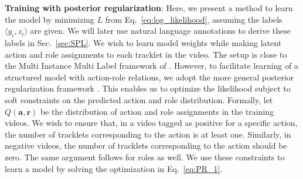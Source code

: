 \documentclass[10pt,twocolumn,letterpaper]{article}
\begin{document}
\noindent \textbf{Training with posterior regularization}: Here, we present a method to
learn the model by minimizing $L$ from Eq.~\ref{eq:log_likelihood}, 
assuming the labels $\langle y_i, z_i \rangle$ are given. 
We will later use natural language annotations to
derive these labels in Sec.~\ref{sec:SPL}. We wish to learn model weights while
making latent action and role assignments to each tracklet in the video. The 
setup is close to the Multi Instance Multi Label framework of \cite{Zhou_NIPS07}. 
However, to facilitate learning of a structured model with action-role
relations, we adopt the more general posterior regularization
framework \cite{Ganchev_JMLR10}.
This enables us to optimize the likelihood subject to soft constraints on
the predicted action and role distribution. Formally, let $Q(\mathbf{a},
\mathbf{r})$ be the distribution of action and role assignments in
the training videos. 
We wish to ensure that, in a video tagged as positive for a specific
action, the number of tracklets corresponding to the action is at least
one. Similarly, in negative videos, the number of tracklets corresponding to
the action should be zero. The same argument follows for roles as
well. We use these constraints to learn a model by solving the
optimization in Eq.~\ref{eq:PR_1}.
\end{document}
